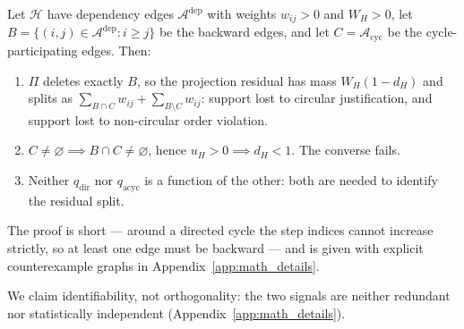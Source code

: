 \begin{proposition}
\label{prop:projection_split}
Let $\mathcal{H}$ have dependency edges $\mathcal{A}^{\mathrm{dep}}$ with weights $w_{ij}>0$ and $W_H>0$, let $B=\{(i,j)\in\mathcal{A}^{\mathrm{dep}}:i\ge j\}$ be the backward edges, and let $C=\mathcal{A}_{\mathrm{cyc}}$ be the cycle-participating edges. Then:
\begin{enumerate}[leftmargin=*,itemsep=1pt,topsep=2pt]
\item[(i)] $\Pi$ deletes exactly $B$, so the projection residual has mass $W_H(1-d_H)$ and splits as $\sum_{B\cap C}w_{ij}+\sum_{B\setminus C}w_{ij}$: support lost to circular justification, and support lost to non-circular order violation.
\item[(ii)] $C\neq\varnothing\implies B\cap C\neq\varnothing$, hence $u_H>0\implies d_H<1$. The converse fails.
\item[(iii)] Neither $q_{\mathrm{dir}}$ nor $q_{\mathrm{acyc}}$ is a function of the other: both are needed to identify the residual split.
\end{enumerate}
\end{proposition}
\noindent The proof is short --- around a directed cycle the step indices cannot increase strictly, so at least one edge must be backward --- and is given with explicit counterexample graphs in Appendix~\ref{app:math_details}.


We claim identifiability, not orthogonality: the two signals are neither redundant nor statistically independent (Appendix~\ref{app:math_details}).

